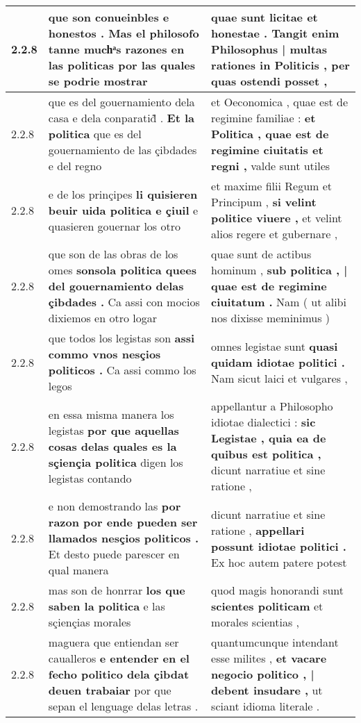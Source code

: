 \begin{tabular}{|p{1cm}|p{6.5cm}|p{6.5cm}|}
2.2.8 & que son conueinbles e honestos . \textbf{ Mas el philosofo tanne muchͣs razones en las politicas } por las quales se podrie mostrar & quae sunt licitae et honestae . \textbf{ Tangit enim Philosophus | multas rationes in Politicis , } per quas ostendi posset , \\\hline
2.2.8 & que es del gouernamiento dela casa e dela conparatid̃ . \textbf{ Et la politica } que es del gouernamiento de las çibdades e del regno & et Oeconomica , quae est de regimine familiae : \textbf{ et Politica , quae est de regimine ciuitatis et regni , } valde sunt utiles \\\hline
2.2.8 & e de los prinçipes \textbf{ li quisieren beuir uida politica e çiuil } e quasieren gouernar los otro & et maxime filii Regum et Principum , \textbf{ si velint politice viuere , } et velint alios regere et gubernare , \\\hline
2.2.8 & que son de las obras de los omes \textbf{ sonsola politica quees del gouernamiento delas çibdades . } Ca assi con mocios dixiemos en otro logar & quae sunt de actibus hominum , \textbf{ sub politica , | quae est de regimine ciuitatum . } Nam ( ut alibi nos dixisse meminimus ) \\\hline
2.2.8 & que todos los legistas son \textbf{ assi commo vnos nesçios politicos . } Ca assi commo los legos & omnes legistae sunt \textbf{ quasi quidam idiotae politici . } Nam sicut laici et vulgares , \\\hline
2.2.8 & en essa misma manera los legistas \textbf{ por que aquellas cosas delas quales es la sçiençia politica } digen los legistas contando & appellantur a Philosopho idiotae dialectici : \textbf{ sic Legistae , quia ea de quibus est politica , } dicunt narratiue et sine ratione , \\\hline
2.2.8 & e non demostrando las \textbf{ por razon por ende pueden ser llamados nesçios politicos . } Et desto puede parescer en qual manera & dicunt narratiue et sine ratione , \textbf{ appellari possunt idiotae politici . } Ex hoc autem patere potest \\\hline
2.2.8 & mas son de honrrar \textbf{ los que saben la politica } e las sçiençias morales & quod magis honorandi sunt \textbf{ scientes politicam } et morales scientias , \\\hline
2.2.8 & maguera que entiendan ser caualleros \textbf{ e entender en el fecho politico dela çibdat deuen trabaiar } por que sepan el lenguage delas letras . & quantumcunque intendant esse milites , \textbf{ et vacare negocio politico , | debent insudare , } ut sciant idioma literale . \\\hline

\end{tabular}
